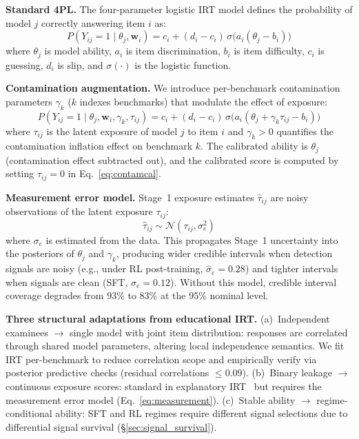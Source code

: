 \documentclass[letterpaper]{article}
\begin{document}
\textbf{Standard 4PL.}
The four-parameter logistic IRT model defines the probability of model $j$ correctly answering item $i$ as:
\begin{equation}
  P(Y_{ij}=1 \mid \theta_j, \mathbf{w}_i) = c_i + (d_i - c_i)\,\sigma\!\bigl(a_i(\theta_j - b_i)\bigr)
  \label{eq:4pl}
\end{equation}
where $\theta_j$ is model ability, $a_i$ is item discrimination, $b_i$ is item difficulty, $c_i$ is guessing, $d_i$ is slip, and $\sigma(\cdot)$ is the logistic function.

\textbf{Contamination augmentation.}
We introduce per-benchmark contamination parameters $\gamma_k$ ($k$ indexes benchmarks) that modulate the effect of exposure:
\begin{equation}
  P(Y_{ij}=1 \mid \theta_j, \mathbf{w}_i, \gamma_k, \tau_{ij}) = c_i + (d_i - c_i)\,\sigma\!\bigl(a_i(\theta_j + \gamma_k \tau_{ij} - b_i)\bigr)
  \label{eq:contamcal}
\end{equation}
where $\tau_{ij}$ is the latent exposure of model $j$ to item $i$ and $\gamma_k > 0$ quantifies the contamination inflation effect on benchmark $k$.
The calibrated ability is $\theta_j$ (contamination effect subtracted out), and the calibrated score is computed by setting $\tau_{ij}=0$ in Eq.~\ref{eq:contamcal}.

\textbf{Measurement error model.}
Stage~1 exposure estimates $\hat{\tau}_{ij}$ are noisy observations of the latent exposure $\tau_{ij}$:
\begin{equation}
  \hat{\tau}_{ij} \sim \mathcal{N}(\tau_{ij}, \sigma_e^2)
  \label{eq:measurement}
\end{equation}
where $\sigma_e$ is estimated from the data.
This propagates Stage~1 uncertainty into the posteriors of $\theta_j$ and $\gamma_k$, producing wider credible intervals when detection signals are noisy (e.g., under RL post-training, $\hat{\sigma}_e = 0.28$) and tighter intervals when signals are clean (SFT, $\hat{\sigma}_e = 0.12$).
Without this model, credible interval coverage degrades from 93\% to 83\% at the 95\% nominal level.

\textbf{Three structural adaptations from educational IRT.}
(a)~Independent examinees $\to$ single model with joint item distribution: responses are correlated through shared model parameters, altering local independence semantics.
We fit IRT per-benchmark to reduce correlation scope and empirically verify via posterior predictive checks (residual correlations $\leq 0.09$).
(b)~Binary leakage $\to$ continuous exposure scores: standard in explanatory IRT~\citep{deboeck2004explanatory} but requires the measurement error model (Eq.~\ref{eq:measurement}).
(c)~Stable ability $\to$ regime-conditional ability: SFT and RL regimes require different signal selections due to differential signal survival (\S\ref{sec:signal_survival}).
\end{document}
